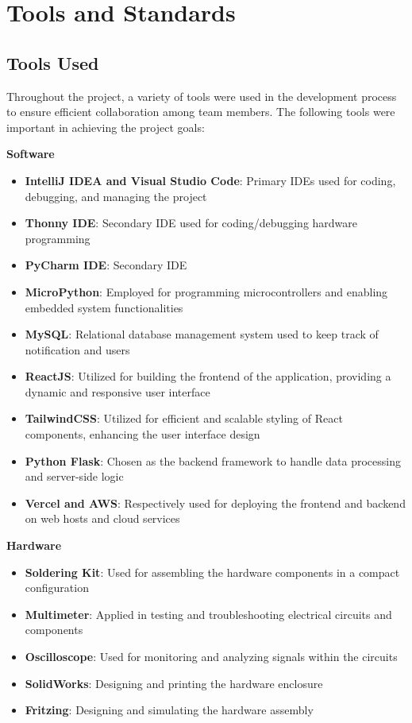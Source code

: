 \section{Tools and Standards}\label{sec:tools-and-standards}

\subsection{Tools Used}\label{subsec:tools-used}
Throughout the project, a variety of tools were used in the development process to
ensure efficient collaboration among team members. %
The following tools were important in achieving the project goals:

\textbf{Software}
\begin{itemize}
    \item \textbf{IntelliJ IDEA and Visual Studio Code}: Primary IDEs used for coding,
    debugging, and managing the project
    \item \textbf{Thonny IDE}: Secondary IDE used for coding/debugging hardware
    programming
    \item \textbf{PyCharm IDE}: Secondary IDE
    \item \textbf{MicroPython}: Employed for programming microcontrollers and enabling embedded system functionalities
    \item \textbf{MySQL}: Relational database management system used to keep track of notification and users
    \item \textbf{ReactJS}: Utilized for building the frontend of the application, providing a dynamic and responsive user interface
    \item \textbf{TailwindCSS}: Utilized for efficient and scalable styling of React components, enhancing the user interface design
    \item \textbf{Python Flask}: Chosen as the backend framework to handle data processing and server-side logic
    \item \textbf{Vercel and AWS}: Respectively used for deploying the frontend and backend on web hosts and cloud services
\end{itemize}

\textbf{Hardware}
\begin{itemize}
    \item \textbf{Soldering Kit}: Used for assembling the hardware components in a compact configuration
    \item \textbf{Multimeter}: Applied in testing and troubleshooting electrical circuits and components
    \item \textbf{Oscilloscope}: Used for monitoring and analyzing signals within the circuits
    \item \textbf{SolidWorks}: Designing and printing the hardware enclosure
    \item \textbf{Fritzing}: Designing and simulating the hardware assembly
\end{itemize}

